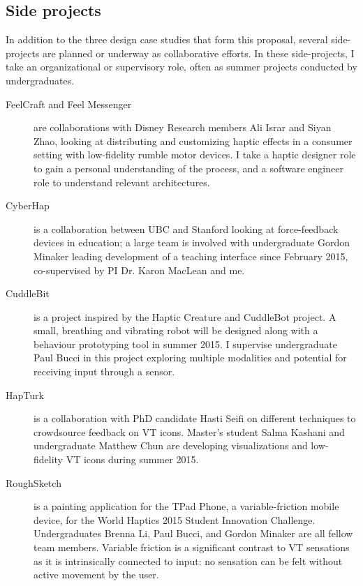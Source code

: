\subsection{Side projects}
In addition to the three design case studies that form this proposal, several side-projects are planned or underway as collaborative efforts.
In these side-projects, I take an organizational or supervisory role, often as summer projects conducted by undergraduates.

\begin{description}
	\item[FeelCraft and Feel Messenger] are collaborations with Disney Research members Ali Israr and Siyan Zhao, looking at distributing and customizing haptic effects in a consumer setting with low-fidelity rumble motor devices.
	I take a haptic designer role to gain a personal understanding of the process, and a software engineer role to understand relevant architectures. %

	\item[CyberHap] is a collaboration between UBC and Stanford looking at force-feedback devices in education; a large team is involved with undergraduate Gordon Minaker leading development of a teaching interface since February 2015, co-supervised by PI Dr. Karon MacLean and me.
	
	\item[CuddleBit] is a project inspired by the Haptic Creature and CuddleBot project. A small, breathing and vibrating robot will be designed along with a behaviour prototyping tool in summer 2015.
	I supervise undergraduate Paul Bucci in this project exploring multiple modalities and potential for receiving input through a sensor.

	\item[HapTurk] is a collaboration with PhD candidate Hasti Seifi on different techniques to crowdsource feedback on VT icons. Master's student Salma Kashani and undergraduate Matthew Chun are developing visualizations and low-fidelity VT icons during summer 2015.

	\item[RoughSketch] is a painting application for the TPad Phone, a variable-friction mobile device, for the World Haptics 2015 Student Innovation Challenge. Undergraduates Brenna Li, Paul Bucci, and Gordon Minaker are all fellow team members. Variable friction is a significant contrast to VT sensations as it is intrinsically connected to input: no sensation can be felt without active movement by the user.
\end{description}



